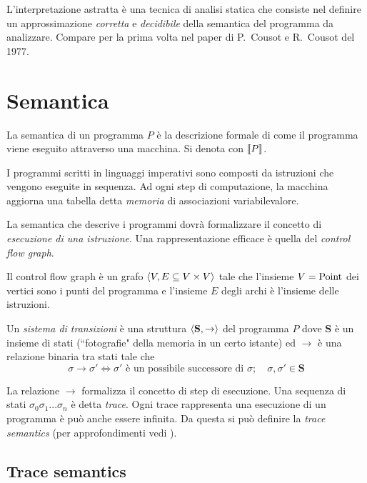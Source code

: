 L'interpretazione astratta è una tecnica di analisi statica che consiste nel definire un approssimazione \emph{corretta} e \emph{decidibile} della semantica del programma da analizzare. Compare per la prima volta nel paper \cite{cousot} di P.~Cousot e R.~Cousot del 1977. 

\section{Semantica}

\begin{definition}[Semantica]
La semantica di un programma $P$ è la descrizione formale di come il programma viene eseguito attraverso una macchina. Si denota con $\llbracket P \rrbracket$. 
\end{definition}

I programmi scritti in linguaggi imperativi sono composti da istruzioni che vengono eseguite in sequenza. Ad ogni step di computazione, la macchina aggiorna una tabella detta \emph{memoria} di associazioni variabile\textrightarrow{}valore. 

La semantica che descrive i programmi dovrà formalizzare il concetto di \emph{esecuzione di una istruzione}. Una rappresentazione efficace è quella del \emph{control flow graph}.

\begin{definition}
Il control flow graph è un grafo $\langle V, E \subseteq V \times V \rangle$ tale che l'insieme $V = \mathrm{Point}$ dei vertici sono i punti del programma e l'insieme $E$ degli archi è l'insieme delle istruzioni. 
\end{definition}

\begin{definition}
Un \emph{sistema di transizioni} è una struttura $\langle \mathbf{S}, \to \rangle$ del programma $P$ dove $\mathbf{S}$ è un insieme di stati (``fotografie" della memoria in un certo istante) ed $\to$ è una relazione binaria tra stati tale che
\[ \sigma \to \sigma' \iff \sigma' \text{ è un possibile successore di } \sigma; \quad \sigma, \sigma' \in \mathbf{S} \]
\end{definition}
La relazione $\to$ formalizza il concetto di step di esecuzione. Una sequenza di stati $\sigma_0 \sigma_1 ... \sigma_n$ è detta \emph{trace}. Ogni trace rappresenta una esecuzione di un programma è può anche essere infinita. Da questa si può definire la \emph{trace semantics} (per approfondimenti vedi \cite{xavier}).

\subsection{Trace semantics}

